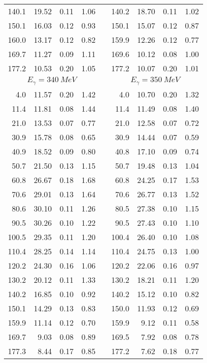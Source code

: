 \begin{table}[htbp]
\begin{center}
\begin{tabular}{|r|r|c|c|l|r|r|c|c|}
140.1 & 19.52 &  0.11 &  1.06 & & 140.2 & 18.70 &  0.11 &  1.02 \\ 
150.1 & 16.03 &  0.12 &  0.93 & & 150.1 & 15.07 &  0.12 &  0.87 \\ 
160.0 & 13.17 &  0.12 &  0.82 & & 159.9 & 12.26 &  0.12 &  0.77 \\ 
169.7 & 11.27 &  0.09 &  1.11 & & 169.6 & 10.12 &  0.08 &  1.00 \\ 
177.2 & 10.53 &  0.20 &  1.05 & & 177.2 & 10.07 &  0.20 &  1.01 \\ 
\hline 
\hline 
\multicolumn{4}{|c|}{ $E_{\gamma}=340~MeV$} & & 
\multicolumn{4}{c|}{ $E_{\gamma}=350~MeV$} \\ 
\cline{1-4} 
\cline{6-9} 
  4.0 & 11.57 &  0.20 &  1.42 & &   4.0 & 10.70 &  0.20 &  1.32 \\ 
 11.4 & 11.81 &  0.08 &  1.44 & &  11.4 & 11.49 &  0.08 &  1.40 \\ 
 21.0 & 13.53 &  0.07 &  0.77 & &  21.0 & 12.58 &  0.07 &  0.72 \\ 
 30.9 & 15.78 &  0.08 &  0.65 & &  30.9 & 14.44 &  0.07 &  0.59 \\ 
 40.9 & 18.52 &  0.09 &  0.80 & &  40.8 & 17.10 &  0.09 &  0.74 \\ 
 50.7 & 21.50 &  0.13 &  1.15 & &  50.7 & 19.48 &  0.13 &  1.04 \\ 
 60.8 & 26.67 &  0.18 &  1.68 & &  60.8 & 24.25 &  0.17 &  1.53 \\ 
 70.6 & 29.01 &  0.13 &  1.64 & &  70.6 & 26.77 &  0.13 &  1.52 \\ 
 80.6 & 30.10 &  0.11 &  1.26 & &  80.5 & 27.38 &  0.10 &  1.15 \\ 
 90.5 & 30.26 &  0.10 &  1.22 & &  90.5 & 27.43 &  0.10 &  1.10 \\ 
100.5 & 29.35 &  0.11 &  1.20 & & 100.4 & 26.40 &  0.10 &  1.08 \\ 
110.4 & 28.25 &  0.14 &  1.14 & & 110.4 & 24.75 &  0.13 &  1.00 \\ 
120.2 & 24.30 &  0.16 &  1.06 & & 120.2 & 22.06 &  0.16 &  0.97 \\ 
130.2 & 20.12 &  0.11 &  1.33 & & 130.2 & 18.21 &  0.11 &  1.20 \\ 
140.2 & 16.85 &  0.10 &  0.92 & & 140.2 & 15.12 &  0.10 &  0.82 \\ 
150.1 & 14.29 &  0.13 &  0.83 & & 150.0 & 11.93 &  0.12 &  0.69 \\ 
159.9 & 11.14 &  0.12 &  0.70 & & 159.9 &  9.12 &  0.11 &  0.58 \\ 
169.7 &  9.03 &  0.08 &  0.89 & & 169.5 &  7.92 &  0.08 &  0.78 \\ 
177.3 &  8.44 &  0.17 &  0.85 & & 177.2 &  7.62 &  0.18 &  0.77 \\ 
\cline{1-4} 
\cline{6-9} 
\end{tabular} 

\end{center} 
\end{table}
